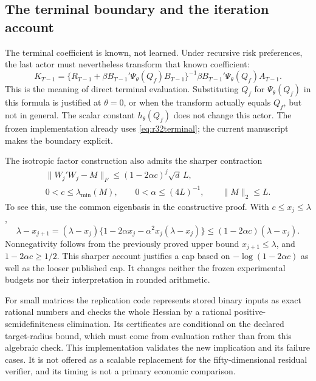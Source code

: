 \subsection{The terminal boundary and the iteration account}
The terminal coefficient is known, not learned. Under recursive risk
preferences, the last actor must nevertheless transform that known coefficient:
\begin{equation}\label{eq:r32terminal}
 K_{T-1}=\{R_{T-1}+\beta B_{T-1}'\Psi_\theta(Q_f)B_{T-1}\}^{-1}
              \beta B_{T-1}'\Psi_\theta(Q_f)A_{T-1}.
\end{equation}
This is the meaning of direct terminal evaluation. Substituting $Q_f$ for
$\Psi_\theta(Q_f)$ in this formula is justified at $\theta=0$, or when the
transform actually equals $Q_f$, but not in general. The scalar constant
$h_\theta(Q_f)$ does not change this actor. The frozen implementation already
uses \eqref{eq:r32terminal}; the current manuscript makes the boundary explicit.

The isotropic factor construction also admits the sharper contraction
\begin{gather*}
 \|W_j'W_j-M\|_F\leq(1-2\alpha c)^j\sqrt d\,L,\\
 0<c\leq\lambda_{\min}(M),\qquad
 0<\alpha\leq(4L)^{-1},\qquad\|M\|_2\leq L.
\end{gather*}
To see this, use the common eigenbasis in the constructive proof. With
$c\leq x_j\leq\lambda$,
\[
 \lambda-x_{j+1}=(\lambda-x_j)
   \{1-2\alpha x_j-\alpha^2x_j(\lambda-x_j)\}
 \leq(1-2\alpha c)(\lambda-x_j).
\]
Nonnegativity follows from the previously proved upper bound
$x_{j+1}\leq\lambda$, and $1-2\alpha c\geq1/2$. This sharper account
justifies a cap based on $-\log(1-2\alpha c)$ as well as the looser published
cap. It changes neither the frozen experimental budgets nor their interpretation
in rounded arithmetic.

For small matrices the replication code represents stored binary inputs as
exact rational numbers and checks the whole Hessian by a rational
positive-semidefiniteness elimination. Its certificates are conditional on the
declared target-radius bound, which must come from evaluation rather than from
this algebraic check. This implementation validates the new implication and
its failure cases. It is not offered as a scalable replacement for the
fifty-dimensional residual verifier, and its timing is not a primary economic
comparison.
